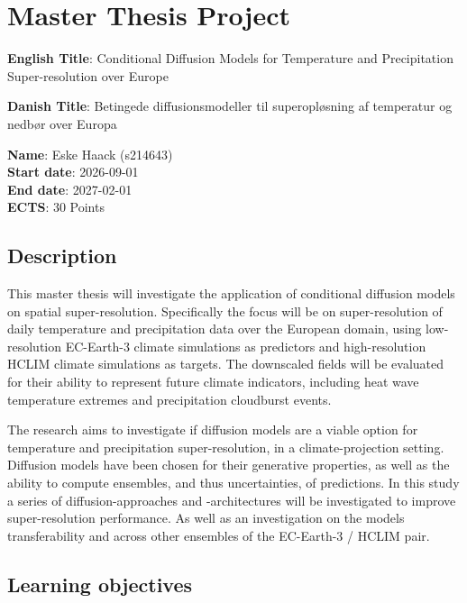 \documentclass[11pt,a4paper]{article}
\begin{document}
\section*{Master Thesis Project}

\textbf{English Title}:
Conditional Diffusion Models for Temperature and Precipitation Super-resolution over Europe

\textbf{Danish Title}:
Betingede diffusionsmodeller til superopløsning af temperatur og nedbør over Europa

\small
\textbf{Name}:
Eske Haack (s214643) \\
\textbf{Start date}:
2026-09-01 \\
\textbf{End date}:
2027-02-01 \\
\textbf{ECTS}:
30 Points

\normalsize
\subsection*{Description}
This master thesis will investigate the application of conditional diffusion models on spatial super-resolution. Specifically the focus will be on super-resolution of daily temperature and precipitation data over the European domain, using low-resolution EC-Earth-3 climate simulations as predictors and high-resolution HCLIM climate simulations as targets. The downscaled fields will be evaluated for their ability to represent future climate indicators, including heat wave temperature extremes and precipitation cloudburst events.

The research aims to investigate if diffusion models are a viable option for temperature and precipitation super-resolution, in a climate-projection setting. Diffusion models have been chosen for their generative properties, as well as the ability to compute ensembles, and thus uncertainties, of predictions.
In this study a series of diffusion-approaches and -architectures will be investigated to improve super-resolution performance. As well as an investigation on the models transferability and across other ensembles of the EC-Earth-3 / HCLIM pair. 

\subsection*{Learning objectives}
\end{document}

